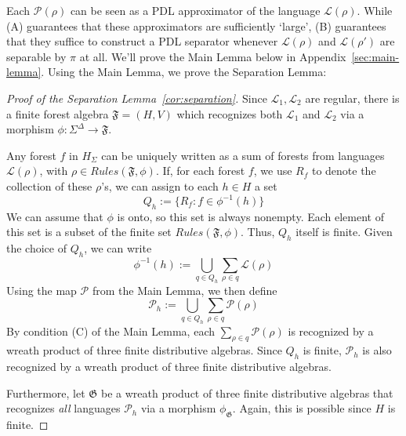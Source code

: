 \documentclass[sigplan,9pt]{acmart}\settopmatter{printfolios=true,printccs=false,printacmref=false}
\theoremstyle{definition}
\newcommand{\La}[0]{{\mathcal{L}}}
\newcommand{\Ff}[0]{{\mathfrak{F}}}
\newcommand{\Gg}[0]{{\mathfrak{G}}}
\newcommand{\Pa}[0]{{\mathcal{P}}}
\begin{document}
Each $\Pa(\rho)$ can be seen as a PDL approximator of the language $\La(\rho)$.
While (A) guarantees that these approximators are sufficiently `large', (B) guarantees that they suffice to construct a PDL separator whenever $\La(\rho)$ and $\La(\rho')$ are separable by $\pi$ at all.
We'll prove the Main Lemma below in Appendix~\ref{sec:main-lemma}. Using the Main Lemma, we prove the Separation Lemma:



\begin{proof}[Proof of the Separation Lemma~\ref{cor:separation}]
Since $\La_1, \La_2$ are regular, there is a finite forest algebra $\Ff = (H,V)$ which recognizes both $\La_1$ and $\La_2$ via a morphism $\phi : \Sigma^\Delta \rightarrow\Ff$.


Any forest $f$ in $H_\Sigma$ can be uniquely written as a sum of forests from languages $\La(\rho)$, with $\rho \in Rules(\Ff,\phi)$.
If, for each forest $f$, we use $R_f$ to denote the collection of these $\rho$'s, we can assign to each $h \in H$ a set
$$Q_h := \{ R_f : f \in \phi^{-1}(h)\}$$
We can assume that $\phi$ is onto, so this set is always nonempty.
Each element of this set is a subset of the finite set $Rules(\Ff,\phi)$.
Thus, $Q_h$ itself is finite.
Given the choice of $Q_h$, we can write
$$\phi^{-1}(h) := \bigcup_{q \in Q_h} \sum_{\rho\in q} \La(\rho)$$
Using the map $\Pa$ from the Main Lemma, we then define $$\Pa_h := \bigcup_{q \in Q_h} \sum_{\rho\in q} \Pa(\rho)$$
By condition (C) of the Main Lemma, each $\sum_{\rho\in q} \Pa(\rho)$ is recognized by a wreath product of three finite distributive algebras.
Since $Q_h$ is finite, $\Pa_h$ is also recognized by a wreath product of three finite distributive algebras.


Furthermore, let $\Gg$ be a wreath product of three finite distributive algebras that recognizes \emph{all} languages $\Pa_h$ via a morphism $\phi_\Gg$.
Again, this is possible since $H$ is finite.


\end{proof}
\end{document}
